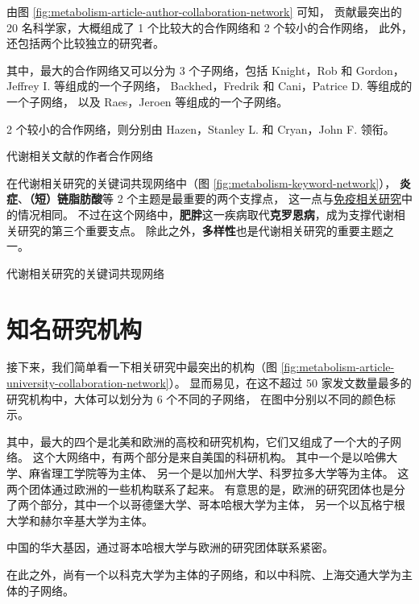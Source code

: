 \documentclass[]{ctexbook}
\begin{document}
由图 \ref{fig:metabolism-article-author-collaboration-network} 可知，
贡献最突出的 20 名科学家，大概组成了 1 个比较大的合作网络和 2 个较小的合作网络，
此外，还包括两个比较独立的研究者。

其中，最大的合作网络又可以分为 3 个子网络，包括 Knight，Rob 和 Gordon，Jeffrey I. 等组成的一个子网络，
Backhed，Fredrik 和 Cani，Patrice D. 等组成的一个子网络，
以及 Raes，Jeroen 等组成的一个子网络。

2 个较小的合作网络，则分别由 Hazen，Stanley L. 和 Cryan，John F. 领衔。

\hypertarget{htmlwidget-f55277bec497f6843407}{}

\label{fig:metabolism-article-author-collaboration-network}代谢相关文献的作者合作网络

在代谢相关研究的关键词共现网络中（图 \ref{fig:metabolism-keyword-network}），
\textbf{炎症}、\textbf{（短）链脂肪酸}等 2 个主题是最重要的两个支撑点，
这一点与\protect\hyperlink{immunity}{免疫相关研究}中的情况相同。
不过在这个网络中，\textbf{肥胖}这一疾病取代\textbf{克罗恩病}，成为支撑代谢相关研究的第三个重要支点。
除此之外，\textbf{多样性}也是代谢相关研究的重要主题之一。

\hypertarget{htmlwidget-42be2759a762f504d6a7}{}

\label{fig:metabolism-keyword-network}代谢相关研究的关键词共现网络

\hypertarget{ux77e5ux540dux7814ux7a76ux673aux6784-1}{%
\section{知名研究机构}\label{ux77e5ux540dux7814ux7a76ux673aux6784-1}}

接下来，我们简单看一下相关研究中最突出的机构（图 \ref{fig:metabolism-article-university-collaboration-network}）。
显而易见，在这不超过 50 家发文数量最多的研究机构中，大体可以划分为 6 个不同的子网络，
在图中分别以不同的颜色标示。

其中，最大的四个是北美和欧洲的高校和研究机构，它们又组成了一个大的子网络。
这个大网络中，有两个部分是来自美国的科研机构。
其中一个是以哈佛大学、麻省理工学院等为主体、
另一个是以加州大学、科罗拉多大学等为主体。
这两个团体通过欧洲的一些机构联系了起来。
有意思的是，欧洲的研究团体也是分了两个部分，其中一个以哥德堡大学、哥本哈根大学为主体，
另一个以瓦格宁根大学和赫尔辛基大学为主体。

中国的华大基因，通过哥本哈根大学与欧洲的研究团体联系紧密。

在此之外，尚有一个以科克大学为主体的子网络，和以中科院、上海交通大学为主体的子网络。
\end{document}
